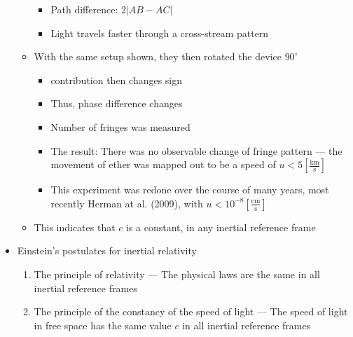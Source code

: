 \begin{itemize}
\begin{itemize}
\begin{itemize}
          \item Path difference: $2|AB-AC|$

          \item Light travels faster through a cross-stream pattern

        \end{itemize}

      \item With the same setup shown, they then rotated the device $90^{\circ}$

        \begin{itemize}

          \item {} contribution then changes sign

          \item Thus, phase difference changes

          \item Number of fringes was measured

          \item The result: There was no observable change of fringe pattern — the movement of ether was mapped out to be a speed of $u < 5\left[ \frac{\si{\kilo\meter}}{\si{\second}} \right]$

          \item This experiment was redone over the course of many years, most recently Herman at al. (2009), with $u < 10^{-8}\left[ \frac{\si{\centi\meter}}{\si{\second}} \right]$

        \end{itemize}

      \item This indicates that $c$ is a constant, in any inertial reference frame

    \end{itemize}

  \item Einstein's postulates for inertial relativity

    \begin{enumerate}

      \item The principle of relativity — The physical laws are the same in all inertial reference frames

      \item The principle of the constancy of the speed of light — The speed of light in free space has the same value $c$ in all inertial reference frames


\end{enumerate}
\end{itemize}
